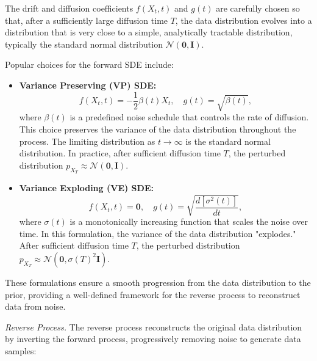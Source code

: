 \begin{itemize}
The drift and diffusion coefficients \( f(X_t, t) \) and \( g(t) \) are carefully chosen so that, after a sufficiently large diffusion time \( T \), the data distribution evolves into a distribution that is very close to a simple, analytically tractable distribution, typically the standard normal distribution \( \mathcal{N}(\mathbf{0}, \mathbf{I}) \).

Popular choices for the forward SDE include: 

    
\begin{itemize}
    \item \textbf{Variance Preserving (VP) SDE:}
    \[
    f(X_t, t) = -\frac{1}{2} \beta(t) X_t, \quad g(t) = \sqrt{\beta(t)},
    \]
    where \( \beta(t) \) is a predefined noise schedule that controls the rate of diffusion. This choice preserves the variance of the data distribution throughout the process. The limiting distribution as \( t \to \infty \) is the standard normal distribution. In practice, after sufficient diffusion time \( T \), the perturbed distribution \( p_{X_T} \approx \mathcal{N}(\mathbf{0}, \mathbf{I}) \).
    
    \item \textbf{Variance Exploding (VE) SDE:}
    \[
    f(X_t, t) = \mathbf{0}, \quad g(t) = \sqrt{\frac{d[\sigma^2(t)]}{dt}},
    \]
    where \( \sigma(t) \) is a monotonically increasing function that scales the noise over time. In this formulation, the variance of the data distribution "explodes." After sufficient diffusion time \( T \), the perturbed distribution \( p_{X_T} \approx \mathcal{N}(\mathbf{0}, \sigma(T)^2 \mathbf{I}) \).
\end{itemize}

\end{itemize}

These formulations ensure a smooth progression from the data distribution to the prior, providing a well-defined framework for the reverse process to reconstruct data from noise.


\textit{Reverse Process.} The reverse process reconstructs the original data distribution by inverting the forward process, progressively removing noise to generate data samples:

